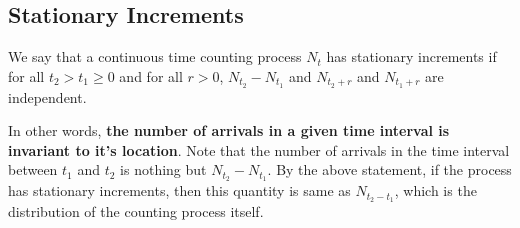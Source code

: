 \documentclass[../../probability-notes.tex]{subfiles}
\begin{document}
    \subsection{Stationary Increments}
    We say that a continuous time counting process $N_{t}$ has stationary increments if for all $t_{2} > t_{1} \geq 0$ and for all $r > 0$, $N_{t_{2}} - N_{t_{1}}$ and $N_{t_{2} + r}$ and $N_{t_{1} + r}$ are independent.\newline

    In other words, \textbf{the number of arrivals in a given time interval is invariant to it's location}. Note that the number of arrivals in the time interval between $t_{1}$ and $t_{2}$ is nothing but $N_{t_{2}} - N_{t_{1}}$. By the above statement, if the process has stationary increments, then this quantity is same as $N_{t_{2} - t_{1}}$, which is the distribution of the counting process itself.
\end{document}
